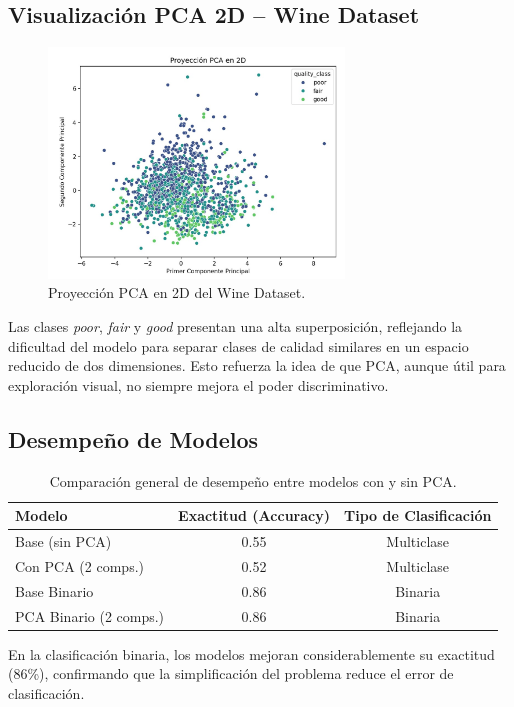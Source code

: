 \documentclass[12pt]{article}
\begin{document}
\subsection{Visualización PCA 2D – Wine Dataset}
\begin{figure}[H]
\centering
\includegraphics[width=0.7\textwidth]{figures/wine_pca_projection.png}
\caption{Proyección PCA en 2D del Wine Dataset.}
\end{figure}

Las clases \textit{poor}, \textit{fair} y \textit{good} presentan una alta superposición, reflejando la dificultad del modelo para separar clases de calidad similares en un espacio reducido de dos dimensiones. Esto refuerza la idea de que PCA, aunque útil para exploración visual, no siempre mejora el poder discriminativo.

\subsection{Desempeño de Modelos}
\begin{table}[H]
\centering
\begin{tabular}{l c c}
\toprule
\textbf{Modelo} & \textbf{Exactitud (Accuracy)} & \textbf{Tipo de Clasificación} \\
\midrule
Base (sin PCA) & 0.55 & Multiclase \\
Con PCA (2 comps.) & 0.52 & Multiclase \\
Base Binario & 0.86 & Binaria \\
PCA Binario (2 comps.) & 0.86 & Binaria \\
\bottomrule
\end{tabular}
\caption{Comparación general de desempeño entre modelos con y sin PCA.}
\end{table}

En la clasificación binaria, los modelos mejoran considerablemente su exactitud (86\%), confirmando que la simplificación del problema reduce el error de clasificación.
\end{document}

